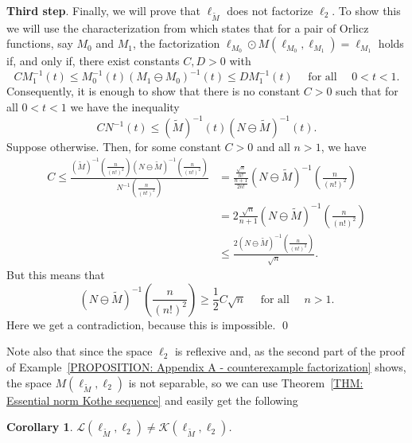 \documentclass[11pt]{amsart}
\theoremstyle{definition}
\theoremstyle{definition}
\theoremstyle{definition}
\newtheorem{corollary}[theorem]{Corollary}
\theoremstyle{definition}
\theoremstyle{definition}
\theoremstyle{definition}
\theoremstyle{definition}
\theoremstyle{definition}
\numberwithin{equation}{section}
\numberwithin{equation}{section}
\numberwithin{equation}{section}
\theoremstyle{definition}
\theoremstyle{definition}
\theoremstyle{definition}
\theoremstyle{definition}
\theoremstyle{definition}
\theoremstyle{definition}
\renewenvironment{proof}{\noindent {\bf Proof.}}{\qed}
\begin{document}
\begin{proof}
	{\bf Third step}. Finally, we will prove that $\ell_{\widetilde{M}}$ does not factorize $\ell_2$.
	To show this we will use the characterization from \cite[Theorem 2]{LT21} which states that for a pair of Orlicz functions,
	say $M_0$ and $M_1$, the factorization $\ell_{M_0}\odot M(\ell_{M_0}, \ell_{M_1}) = \ell_{M_1}$ holds if, and only if, there exist
	constants $C, D > 0$ with
	\begin{equation*}
		C M_1^{-1}(t) \leqslant M_0^{-1}(t)(M_1 \ominus M_0)^{-1}(t) \leqslant DM_1^{-1}(t) \quad \text{ for all } \quad 0 < t < 1.
	\end{equation*}
	Consequently, it is enough to show that there is no constant $C > 0$ such that for all $0 < t < 1$ we have the inequality
	\begin{equation*}
		C N^{-1}(t)\leqslant \left( \widetilde{M} \right)^{-1}(t)\left( N \ominus \widetilde{M} \right)^{-1}(t).
	\end{equation*}
	Suppose otherwise. Then, for some constant $C > 0$ and all $n > 1$, we have
	\begin{align*}
		C \leqslant \frac{\left( \widetilde{M} \right)^{-1}\left(\frac{n}{(n!)^2}\right)\left( N \ominus \widetilde{M} \right)^{-1}\left(\frac{n}{(n!)^2}\right)}{N^{-1}\left(\frac{n}{(n!)^2}\right)}
		  & = \frac{\frac{\sqrt{n}}{n!}}{\frac{n+1}{2n!}}\left( N \ominus \widetilde{M} \right)^{-1}\left(\frac{n}{(n!)^2}\right) \\
		  & = 2\frac{\sqrt{n}}{n+1}\left( N \ominus \widetilde{M} \right)^{-1}\left(\frac{n}{(n!)^2}\right) \\
		  & \leqslant \frac{2\left( N \ominus \widetilde{M} \right)^{-1}\left(\frac{n}{(n!)^2}\right)}{\sqrt{n}}.
	\end{align*}
	But this means that
	\begin{equation*}
		\left( N \ominus \widetilde{M} \right)^{-1}\left(\frac{n}{(n!)^2}\right) \geqslant \frac{1}{2}C\sqrt{n} \quad \text{ for all } \quad n > 1.
	\end{equation*}
	Here we get a contradiction, because this is impossible.
\end{proof}

Note also that since the space $\ell_2$ is reflexive and, as the second part of the proof of Example~\ref{PROPOSITION: Appendix A - counterexample factorization}
shows, the space $M(\ell_{\widetilde{M}}, \ell_2)$ is not separable, so we can use Theorem~\ref{THM: Essential norm Kothe sequence} and easily get the following

\begin{corollary} \label{COR: Appendix A}
	{\it $\mathscr{L}(\ell_{\widetilde{M}}, \ell_2) \neq \mathscr{K}(\ell_{\widetilde{M}}, \ell_2)$.}
\end{corollary}
\end{document}
